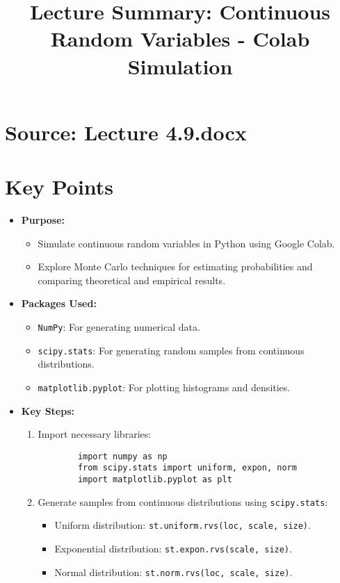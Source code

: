 \documentclass{article}
\title{Lecture Summary: Continuous Random Variables - Colab Simulation}
\author{}
\date{}
\begin{document}
\maketitle

\section*{Source: Lecture 4.9.docx}

\section*{Key Points}

\begin{itemize}
  \item \textbf{Purpose:}
    \begin{itemize}
      \item Simulate continuous random variables in Python using Google Colab.
      \item Explore Monte Carlo techniques for estimating probabilities and comparing theoretical and empirical results.
    \end{itemize}

  \item \textbf{Packages Used:}
    \begin{itemize}
      \item \texttt{NumPy}: For generating numerical data.
      \item \texttt{scipy.stats}: For generating random samples from continuous distributions.
      \item \texttt{matplotlib.pyplot}: For plotting histograms and densities.
    \end{itemize}

  \item \textbf{Key Steps:}
    \begin{enumerate}
      \item Import necessary libraries:
        \begin{verbatim}
        import numpy as np
        from scipy.stats import uniform, expon, norm
        import matplotlib.pyplot as plt
        \end{verbatim}

      \item Generate samples from continuous distributions using \texttt{scipy.stats}:
        \begin{itemize}
          \item Uniform distribution: \texttt{st.uniform.rvs(loc, scale, size)}.
          \item Exponential distribution: \texttt{st.expon.rvs(scale, size)}.
          \item Normal distribution: \texttt{st.norm.rvs(loc, scale, size)}.
        \end{itemize}


\end{enumerate}
\end{itemize}
\end{document}
